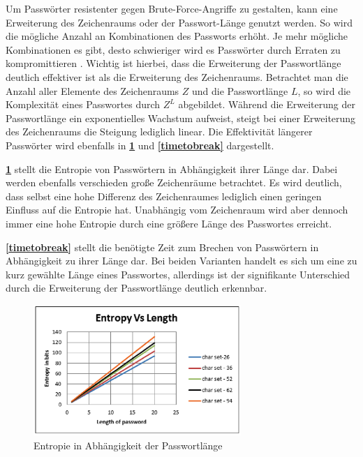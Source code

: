     Um Passwörter resistenter gegen Brute-Force-Angriffe zu gestalten, kann eine Erweiterung des Zeichenraums oder der Passwort-Länge genutzt werden. So wird die mögliche Anzahl an Kombinationen des Passworts erhöht. Je mehr mögliche Kombinationen es gibt, desto schwieriger wird es Passwörter durch Erraten zu kompromittieren \cite{chanda2016password}. Wichtig ist hierbei, dass die Erweiterung der Passwortlänge deutlich effektiver ist als die Erweiterung des Zeichenraums. Betrachtet man die Anzahl aller Elemente des Zeichenraums $Z$ und die Passwortlänge $L$, so wird die Komplexität eines Passwortes durch $Z^L$ abgebildet. Während die Erweiterung der Passwortlänge ein exponentielles Wachstum aufweist, steigt bei einer Erweiterung des Zeichenraums die Steigung lediglich linear. Die Effektivität längerer Passwörter wird ebenfalls in \textbf{\ref{EntropyvsLength}} und \textbf{\ref{timetobreak}} dargestellt. 

    \textbf{\ref{EntropyvsLength}} stellt die Entropie von Passwörtern in Abhängigkeit ihrer Länge dar. Dabei werden ebenfalls verschieden große Zeichenräume betrachtet. Es wird deutlich, dass selbst eine hohe Differenz des Zeichenraumes lediglich einen geringen Einfluss auf die Entropie hat. Unabhängig vom Zeichenraum wird aber dennoch immer eine hohe Entropie durch eine größere Länge des Passwortes erreicht. 
    
    \textbf{\ref{timetobreak}} stellt die benötigte Zeit zum Brechen von Passwörtern in Abhängigkeit zu ihrer Länge dar. Bei beiden Varianten handelt es sich um eine zu kurz gewählte Länge eines Passwortes, allerdings ist der signifikante Unterschied durch die Erweiterung der Passwortlänge  deutlich erkennbar.

    \begin{figure}[h]
        \centering 
        \includegraphics[width=0.7\textwidth]{img/abbildungen/entropy-length.png}
        \captionsetup{format=hang}
        \caption{Entropie in Abhängigkeit der Passwortlänge \cite{chanda2016password}} \label{EntropyvsLength}
    \end{figure}
    

